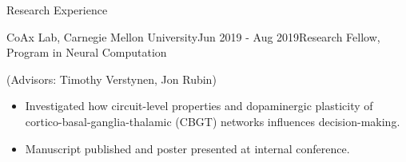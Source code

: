 \documentclass{resume} %
\begin{document}
\begin{rSection}{Research Experience}

\begin{rSubsection}{CoAx Lab, Carnegie Mellon University}{Jun 2019 - Aug 2019}{Research Fellow, Program in Neural Computation}{}
\item (Advisors: Timothy Verstynen, Jon Rubin)
\begin{itemize}
    \item Investigated how circuit-level properties and dopaminergic plasticity of cortico-basal-ganglia-thalamic (CBGT) networks influences decision-making.
    \item Manuscript published and poster presented at internal conference. 
\end{itemize}
\end{rSubsection}

\end{rSection}
\end{document}
